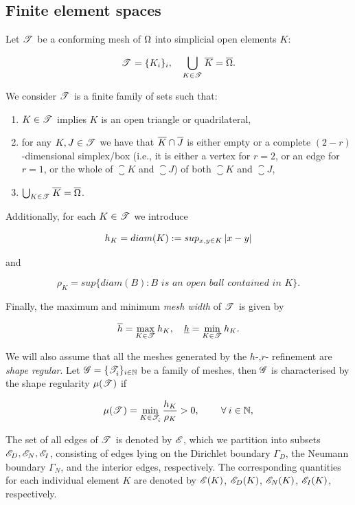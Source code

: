 \documentclass[a4paper,11pt]{article}
\begin{document}
{\subsection{Finite element spaces}

Let $\mathscr T^{}$ be a conforming mesh of $\Omega$ into simplicial open elements $K$:

$$ \mathscr T^{} = \{K_{i}\}_{i}, \quad \bigcup_{K \in \mathscr T^{}} \overline{K} = \overline{\Omega}.$$

We consider $\mathscr T^{}$ is a finite family of sets such
that:
\begin{enumerate}
\item $K\in\mathscr T^{}$ implies $K$ is an open triangle or quadrilateral,
\item for any $K,J\in\mathscr T^{}$ we have that $\overline{K}\cap\overline{J}$ is either empty or
  a complete $(2-r)$-dimensional simplex/box (i.e., it is either a vertex for $r=2$, or an
  edge for $r=1$, or the whole of $\closure K$ and $\closure J$) of both
  $\closure K$ and $\closure J$,
\item $\bigcup_{K\in\mathscr T^{}}\overline{K}=\overline{\Omega}$.
\end{enumerate}

Additionally, for each $K \in \mathscr T^{}$ we introduce 

$$h_{K} = diam(K) := sup_{x,y \in K} \left|x - y\right| $$

and 

$$\rho_{K} = sup\{diam(B) : B \textit{ is an open ball contained in } K\}. $$

Finally, the maximum and minimum \textit{mesh width} of $\mathscr T^{}$ is given by

$$\overline{h} = \max_{K \in \mathscr T^{}} h_{K}, \quad \underline{h} = \min_{K \in \mathscr T^{}} h_{K}.$$

We will also assume that all the meshes generated by the $h$-,$r$- refinement are \textit{shape regular}. Let $\mathscr G = \{ \mathscr T^{}_{i} \}_{i\in \mathbb N}$ be a family of meshes, then $\mathscr G$ is characterised by the shape regularity $\mu(\mathscr T^{})$ if
    
\begin{equation}
        \mu(\mathscr T^{}) = \min_{K\in \mathscr T^{}_{i}}\frac{h_{K}}{\rho_{K}} > 0, \quad \quad\:\forall\: i \in \mathbb{N},
\label{eq:shape_regularity}
\end{equation}
    
The set of all edges of $\mathscr T^{}$ is denoted by $\mathscr E$, which we partition into subsets $\mathscr E_{D}, \mathscr E_{N}, \mathscr E_{I}$, consisting of edges lying on the Dirichlet boundary $\Gamma_{D}$, the Neumann boundary $\Gamma_{N}$, and the interior edges, respectively. The corresponding quantities for each individual element $K$ are denoted by $\mathscr E(K)$, $\mathscr E_{D}(K)$, $\mathscr E_{N}(K)$, $\mathscr E_{I}(K)$, respectively. 

}
\end{document}

